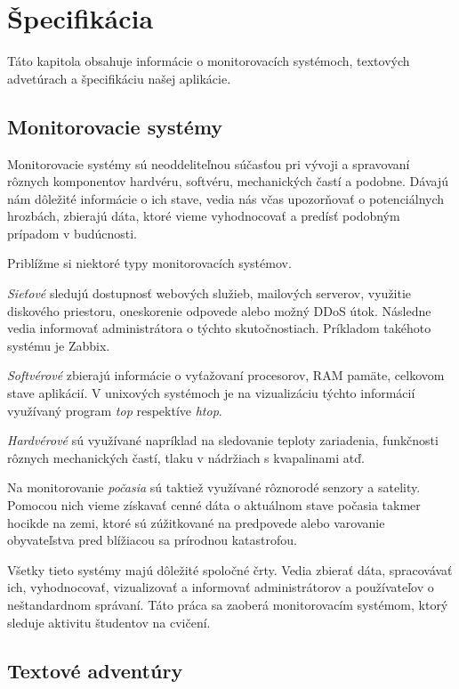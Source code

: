 \chapter{Špecifikácia}
\label{kap:specifikacia}

Táto kapitola obsahuje informácie o monitorovacích systémoch, textových advetúrach a špecifikáciu našej aplikácie.

\section{Monitorovacie systémy}
\label{sec:monitorsystems}

Monitorovacie systémy sú neoddeliteľnou súčasťou pri vývoji a spravovaní rôznych
komponentov hardvéru, softvéru, mechanických častí a podobne. Dávajú nám dôležité
informácie o ich stave, vedia nás včas upozorňovať o potenciálnych hrozbách,
zbierajú dáta, ktoré vieme vyhodnocovať a predísť podobným prípadom v budúcnosti.

Priblížme si niektoré typy monitorovacích systémov.

\textit{Sieťové} sledujú dostupnosť webových služieb, mailových serverov, využitie
diskového priestoru, oneskorenie odpovede alebo možný DDoS útok. Následne vedia informovať administrátora o týchto skutočnostiach. Príkladom takéhoto systému je Zabbix.
~\cite{bib:networkmonitoring}

\textit{Softvérové} zbierajú informácie o vyťažovaní procesorov, RAM pamäte, celkovom
stave aplikácií. V unixových systémoch je na vizualizáciu týchto informácií využívaný
program \textit{top} respektíve \textit{htop}.

\textit{Hardvérové} sú využívané napríklad na sledovanie teploty zariadenia, funkčnosti rôznych mechanických častí, tlaku v nádržiach s kvapalinami atď. 

Na monitorovanie \textit{počasia} sú taktiež využívané rôznorodé senzory a satelity.
Pomocou nich vieme získavať cenné dáta o aktuálnom stave počasia takmer hocikde
na zemi, ktoré sú zúžitkované na predpovede alebo varovanie obyvateľstva pred
blížiacou sa prírodnou katastrofou.

Všetky tieto systémy majú dôležité spoločné črty. Vedia zbierať dáta, spracovávať ich,
vyhodnocovať, vizualizovať a informovať administrátorov a používateľov o neštandardnom
správaní. Táto práca sa zaoberá monitorovacím systémom, ktorý sleduje aktivitu
študentov na cvičení.

\section{Textové adventúry}
\label{sec:textadventures}

